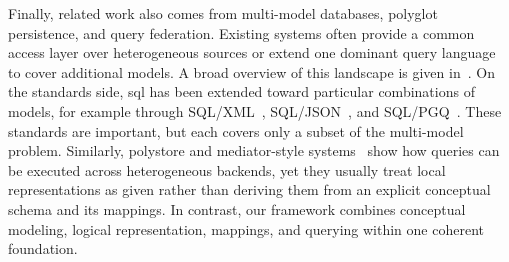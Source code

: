 Finally, related work also comes from multi-model databases, polyglot persistence, and query federation. Existing systems often provide a common access layer over heterogeneous sources or extend one dominant query language to cover additional models. A broad overview of this landscape is given in~\citep{Jiaheng2023Survey}. On the standards side, \acrshort{sql} has been extended toward particular combinations of models, for example through SQL/XML~\citep{SQLXML}, SQL/JSON~\citep{SQLJSON}, and SQL/PGQ~\citep{SQLPGQ}. These standards are important, but each covers only a subset of the multi-model problem. Similarly, polystore and mediator-style systems~\citep{conf/cikm/LuHC18, DBLP:journals/ijcc/BondiombouyV16,alotaibi2020estocada} show how queries can be executed across heterogeneous backends, yet they usually treat local representations as given rather than deriving them from an explicit conceptual schema and its mappings. In contrast, our framework combines conceptual modeling, logical representation, mappings, and querying within one coherent foundation.



